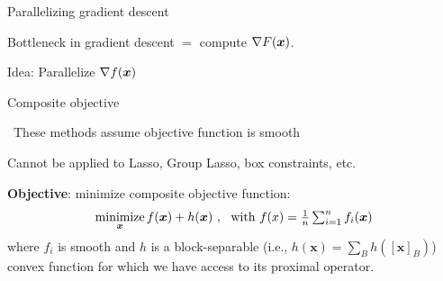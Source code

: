 \documentclass[10pt, notes]{beamer}
\let\oldparencite=\parencite
\renewcommand{\parencite}[1]{\textcolor[rgb]{.7,.7,.7}{\oldparencite{#1}}}
\begin{document}
\begin{frame}{Parallelizing gradient descent}

Bottleneck in gradient descent $=$ compute $\nabla F({\boldsymbol x})$.

Idea: Parallelize $\nabla f({\boldsymbol x})$

\end{frame}



\begin{frame}{Composite objective}

\faExclamationTriangle~These methods assume objective function is smooth

Cannot be applied to Lasso, Group Lasso, box constraints, etc.

\pause 
\vspace{5mm}
{\bfseries Objective}: minimize composite objective function:
$$
\operatorname*{minimize}_{{\boldsymbol x}} f({\boldsymbol x}) + h({\boldsymbol x})~,~ \text{ with $f(x) = \textstyle \frac{1}{n}\sum_{i=1}^n f_i({\boldsymbol x})$}
$$
where $f_i$ is smooth and $h$ is a block-separable (i.e., $h(\boldsymbol{x}) = \sum_{B} h([\boldsymbol{x}]_B)$) convex function for which we have access to its proximal operator.
\end{frame}



% 
% 
% 
% 
%  
%  
\end{document}
